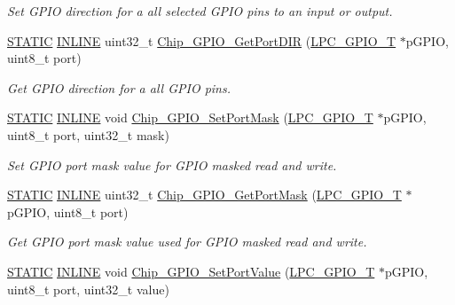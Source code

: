 \begin{DoxyCompactItemize}
\begin{DoxyCompactList}\small\item\em Set G\+P\+IO direction for a all selected G\+P\+IO pins to an input or output. \end{DoxyCompactList}\item 
\hyperlink{group___l_p_c___types___public___macros_ga10b2d890d871e1489bb02b7e70d9bdfb}{S\+T\+A\+T\+IC} \hyperlink{spifi__18xx__43xx_8h_a2eb6f9e0395b47b8d5e3eeae4fe0c116}{I\+N\+L\+I\+NE} uint32\+\_\+t \hyperlink{group___g_p_i_o__18_x_x__43_x_x_ga06f22d0dfeb6a06b8280df9bead0fc4b}{Chip\+\_\+\+G\+P\+I\+O\+\_\+\+Get\+Port\+D\+IR} (\hyperlink{struct_l_p_c___g_p_i_o___t}{L\+P\+C\+\_\+\+G\+P\+I\+O\+\_\+T} $\ast$p\+G\+P\+IO, uint8\+\_\+t port)
\begin{DoxyCompactList}\small\item\em Get G\+P\+IO direction for a all G\+P\+IO pins. \end{DoxyCompactList}\item 
\hyperlink{group___l_p_c___types___public___macros_ga10b2d890d871e1489bb02b7e70d9bdfb}{S\+T\+A\+T\+IC} \hyperlink{spifi__18xx__43xx_8h_a2eb6f9e0395b47b8d5e3eeae4fe0c116}{I\+N\+L\+I\+NE} void \hyperlink{group___g_p_i_o__18_x_x__43_x_x_gaee2115e847a281cf3da40209ce6336c8}{Chip\+\_\+\+G\+P\+I\+O\+\_\+\+Set\+Port\+Mask} (\hyperlink{struct_l_p_c___g_p_i_o___t}{L\+P\+C\+\_\+\+G\+P\+I\+O\+\_\+T} $\ast$p\+G\+P\+IO, uint8\+\_\+t port, uint32\+\_\+t mask)
\begin{DoxyCompactList}\small\item\em Set G\+P\+IO port mask value for G\+P\+IO masked read and write. \end{DoxyCompactList}\item 
\hyperlink{group___l_p_c___types___public___macros_ga10b2d890d871e1489bb02b7e70d9bdfb}{S\+T\+A\+T\+IC} \hyperlink{spifi__18xx__43xx_8h_a2eb6f9e0395b47b8d5e3eeae4fe0c116}{I\+N\+L\+I\+NE} uint32\+\_\+t \hyperlink{group___g_p_i_o__18_x_x__43_x_x_ga6b8d692c29a4d64326130bd237826a4b}{Chip\+\_\+\+G\+P\+I\+O\+\_\+\+Get\+Port\+Mask} (\hyperlink{struct_l_p_c___g_p_i_o___t}{L\+P\+C\+\_\+\+G\+P\+I\+O\+\_\+T} $\ast$p\+G\+P\+IO, uint8\+\_\+t port)
\begin{DoxyCompactList}\small\item\em Get G\+P\+IO port mask value used for G\+P\+IO masked read and write. \end{DoxyCompactList}\item 
\hyperlink{group___l_p_c___types___public___macros_ga10b2d890d871e1489bb02b7e70d9bdfb}{S\+T\+A\+T\+IC} \hyperlink{spifi__18xx__43xx_8h_a2eb6f9e0395b47b8d5e3eeae4fe0c116}{I\+N\+L\+I\+NE} void \hyperlink{group___g_p_i_o__18_x_x__43_x_x_ga095eb3a5396553fa88997b4cfd21e644}{Chip\+\_\+\+G\+P\+I\+O\+\_\+\+Set\+Port\+Value} (\hyperlink{struct_l_p_c___g_p_i_o___t}{L\+P\+C\+\_\+\+G\+P\+I\+O\+\_\+T} $\ast$p\+G\+P\+IO, uint8\+\_\+t port, uint32\+\_\+t value)

\end{DoxyCompactItemize}
